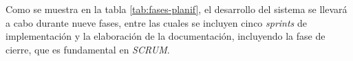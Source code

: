         Como se muestra en la tabla \ref{tab:fases-planif}, el desarrollo del sistema se llevará a cabo durante nueve fases, entre las cuales se incluyen cinco \textit{sprints} de implementación y la elaboración de la documentación, incluyendo la fase de cierre, que es fundamental en \textit{SCRUM}.
            
        \begin{table}[h!]             
            \centering                  
            \caption{Planificación de las fases}
            \label{tab:fases-planif}
        \end{table}

